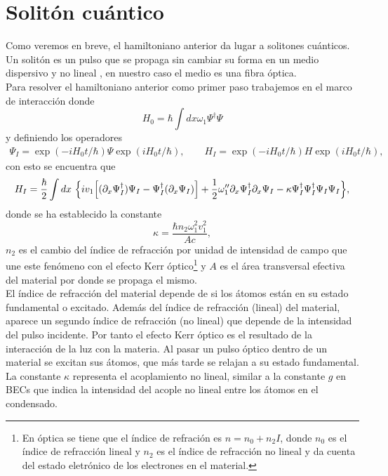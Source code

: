 \section{Solit\'{o}n cu\'{a}ntico}
Como veremos en breve, el hamiltoniano anterior da lugar a solitones cuánticos. Un solit\'{o}n es un pulso que se propaga sin cambiar su forma en un medio dispersivo y no lineal \citep{kivshar2003optical}, en nuestro caso el medio es una fibra \'{o}ptica. \\
Para resolver el hamiltoniano anterior como primer paso trabajemos en el marco de interacci\'{o}n donde
\begin{equation}
H_0=\hbar\int dx \omega_1 \Psi^{\dagger}\Psi
\end{equation}
y definiendo los operadores
\begin{align}\label{ec:p1}
\Psi_I=\exp(-iH_0t/\hbar)\Psi\exp(iH_0t/\hbar), \qquad H_I=\exp(-iH_0t/\hbar)H\exp(iH_0t/\hbar),
\end{align}
con esto se encuentra que
\begin{align}\label{ec:p2}
H_I=\frac{\hbar}{2}\int dx \ \Bigl\{iv_1\Bigl[(\partial_x\Psi_I^{\dagger})\Psi_I-\Psi_I^{\dagger}(\partial_x\Psi_I)\Bigr]+\frac{1}{2}\omega_1''\partial_x\Psi^{\dagger}_I\partial_x\Psi_I-\kappa \Psi^{\dagger}_I\Psi^{\dagger}_I\Psi_I\Psi_I\Bigr\},
\end{align}
donde se ha establecido la constante
\begin{equation}
\kappa=\frac{\hbar n_2\omega_1^2v_1^2}{Ac},
\end{equation}
$n_2$ es el cambio del índice de refracción por unidad de intensidad de campo que une este fen\'{o}meno con el efecto Kerr \'{o}ptico\footnote{En \'{o}ptica se tiene que el \'{i}ndice de refraci\'{o}n es $n=n_0+n_2I$, donde $n_0$ es el \'{i}ndice de refracci\'{o}n lineal y $n_2$ es el \'{i}ndice de refracci\'{o}n no lineal y da cuenta del estado eletr\'{o}nico de los electrones en el material.} y $A$ es el \'{a}rea transversal efectiva del material por donde se propaga el mismo.\\

El índice de refracción del material depende de si los átomos están en su estado fundamental o excitado. Además del índice de refracción (lineal) del material, aparece un segundo índice de refracción (no lineal) que depende de la intensidad del pulso incidente. Por tanto el efecto Kerr \'{o}ptico es el resultado de la interacción de la luz con la materia. Al pasar un pulso óptico dentro de un material se excitan sus átomos, que más tarde se relajan a su estado fundamental. La constante $\kappa$ representa el acoplamiento no lineal, similar a la constante $g$ en BECs que indica la intensidad del acople no lineal entre los \'{a}tomos en el condensado. \\

